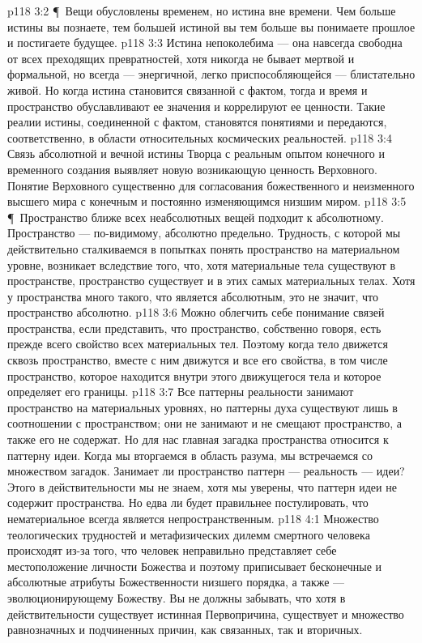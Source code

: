 \vs p118 3:2 \P\ Вещи обусловлены временем, но истина вне времени. Чем больше истины вы познаете, тем большей истиной вы  тем больше вы понимаете прошлое и постигаете будущее.
\vs p118 3:3 Истина непоколебима --- она навсегда свободна от всех преходящих превратностей, хотя никогда не бывает мертвой и формальной, но всегда --- энергичной, легко приспособляющейся --- блистательно живой. Но когда истина становится связанной с фактом, тогда и время и пространство обуславливают ее значения и коррелируют ее ценности. Такие реалии истины, соединенной с фактом, становятся понятиями и передаются, соответственно, в области относительных космических реальностей.
\vs p118 3:4 Связь абсолютной и вечной истины Творца с реальным опытом конечного и временного создания выявляет новую возникающую ценность Верховного. Понятие Верховного существенно для согласования божественного и неизменного высшего мира с конечным и постоянно изменяющимся низшим миром.
\vs p118 3:5 \P\ Пространство ближе всех неабсолютных вещей подходит к абсолютному. Пространство --- по\hyp{}видимому, абсолютно предельно. Трудность, с которой мы действительно сталкиваемся в попытках понять пространство на материальном уровне, возникает вследствие того, что, хотя материальные тела существуют в пространстве, пространство существует и в этих самых материальных телах. Хотя у пространства много такого, что является абсолютным, это не значит, что пространство абсолютно.
\vs p118 3:6 Можно облегчить себе понимание связей пространства, если представить, что пространство, собственно говоря, есть прежде всего свойство всех материальных тел. Поэтому когда тело движется сквозь пространство, вместе с ним движутся и все его свойства, в том числе пространство, которое находится внутри этого движущегося тела и которое определяет его границы.
\vs p118 3:7 Все паттерны реальности занимают пространство на материальных уровнях, но паттерны духа существуют лишь в соотношении с пространством; они не занимают и не смещают пространство, а также его не содержат. Но для нас главная загадка пространства относится к паттерну идеи. Когда мы вторгаемся в область разума, мы встречаемся со множеством загадок. Занимает ли пространство паттерн --- реальность --- идеи? Этого в действительности мы не знаем, хотя мы уверены, что паттерн идеи не содержит пространства. Но едва ли будет правильнее постулировать, что нематериальное всегда является непространственным.
\vs p118 4:1 Множество теологических трудностей и метафизических дилемм смертного человека происходят из\hyp{}за того, что человек неправильно представляет себе местоположение личности Божества и поэтому приписывает бесконечные и абсолютные атрибуты Божественности низшего порядка, а также --- эволюционирующему Божеству. Вы не должны забывать, что хотя в действительности существует истинная Первопричина, существует и множество равнозначных и подчиненных причин, как связанных, так и вторичных.
